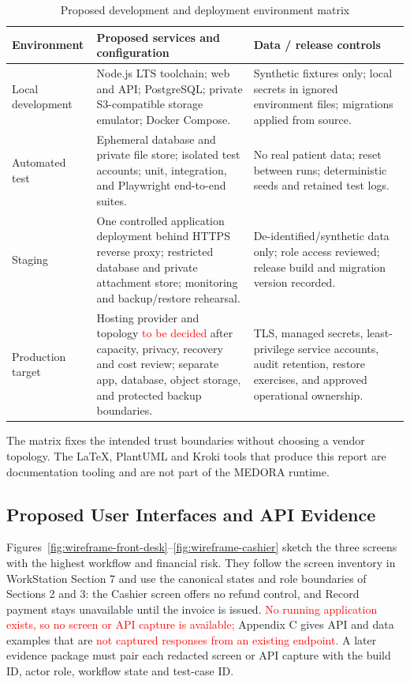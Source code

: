 \documentclass[a4paper,12pt]{article}
\newcommand{\weak}[1]{\textcolor{red}{#1}}
\begin{document}
\begin{table}[H]
\centering
\small
\renewcommand{\arraystretch}{1.10}
\begin{tabularx}{\textwidth}{@{}P{0.18\textwidth}P{0.41\textwidth}Y@{}}
\toprule
Environment & Proposed services and configuration & Data / release controls \\
\midrule
Local development & Node.js LTS toolchain; web and API; PostgreSQL; private S3-compatible storage emulator; Docker Compose. & Synthetic fixtures only; local secrets in ignored environment files; migrations applied from source. \\
Automated test & Ephemeral database and private file store; isolated test accounts; unit, integration, and Playwright end-to-end suites. & No real patient data; reset between runs; deterministic seeds and retained test logs. \\
Staging & One controlled application deployment behind HTTPS reverse proxy; restricted database and private attachment store; monitoring and backup/restore rehearsal. & De-identified/synthetic data only; role access reviewed; release build and migration version recorded. \\
Production target & Hosting provider and topology \weak{to be decided} after capacity, privacy, recovery and cost review; separate app, database, object storage, and protected backup boundaries. & TLS, managed secrets, least-privilege service accounts, audit retention, restore exercises, and approved operational ownership. \\
\bottomrule
\end{tabularx}
\caption{Proposed development and deployment environment matrix}
\label{tab:proposed-environments}
\end{table}

The matrix fixes the intended trust boundaries without choosing a vendor topology. The LaTeX, PlantUML and Kroki tools that produce this report are documentation tooling and are not part of the MEDORA runtime.

\subsection{Proposed User Interfaces and API Evidence}
Figures~\ref{fig:wireframe-front-desk}--\ref{fig:wireframe-cashier} sketch the three screens with the highest workflow and financial risk. They follow the screen inventory in WorkStation Section 7 and use the canonical states and role boundaries of Sections 2 and 3: the Cashier screen offers no refund control, and Record payment stays unavailable until the invoice is issued. \weak{No running application exists, so no screen or API capture is available;} Appendix C gives API and data examples that are \weak{not captured responses from an existing endpoint.} A later evidence package must pair each redacted screen or API capture with the build ID, actor role, workflow state and test-case ID.
\end{document}
